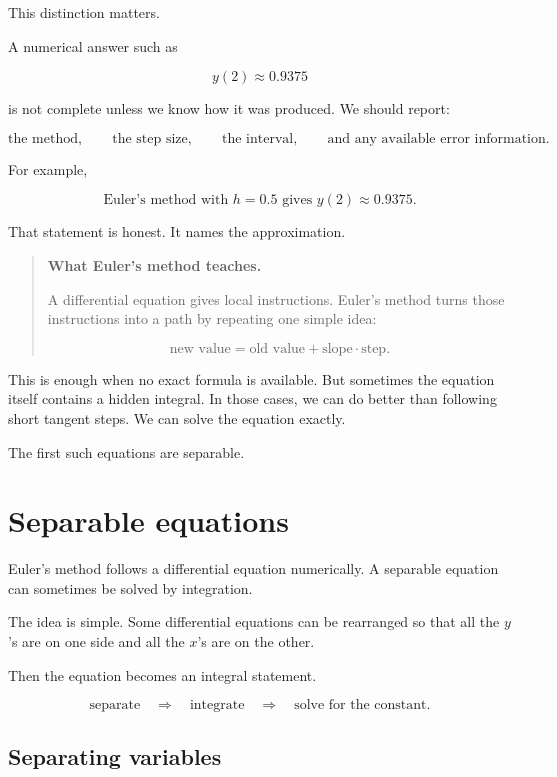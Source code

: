 This distinction matters.

A numerical answer such as

\[
y(2)\approx0.9375
\]

is not complete unless we know how it was produced.  We should report:

\[
\text{the method},
\qquad
\text{the step size},
\qquad
\text{the interval},
\qquad
\text{and any available error information}.
\]

For example,

\[
\boxed{
\text{Euler's method with \(h=0.5\) gives \(y(2)\approx0.9375\).}
}
\]

That statement is honest.  It names the approximation.

\begin{quote}
\textbf{What Euler's method teaches.}

A differential equation gives local instructions.  Euler's method turns those instructions
into a path by repeating one simple idea:

\[
\text{new value}=\text{old value}+\text{slope}\cdot\text{step}.
\]
\end{quote}

This is enough when no exact formula is available.  But sometimes the equation itself
contains a hidden integral.  In those cases, we can do better than following short
tangent steps.  We can solve the equation exactly.

The first such equations are separable.

\section{Separable equations}
\label{sec:separable-equations}

Euler's method follows a differential equation numerically.  A separable equation can
sometimes be solved by integration.

The idea is simple.  Some differential equations can be rearranged so that all the \(y\)'s
are on one side and all the \(x\)'s are on the other.

Then the equation becomes an integral statement.

\[
\text{separate}
\quad\Longrightarrow\quad
\text{integrate}
\quad\Longrightarrow\quad
\text{solve for the constant}.
\]

\subsection{Separating variables}
\label{subsec:separating-variables}

